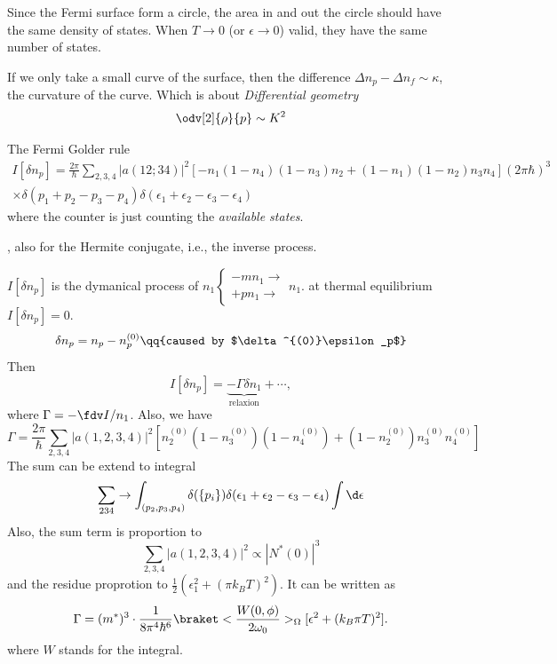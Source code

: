 \begin{remark}
Since the Fermi surface form a circle,
the area in and out the circle should have the same density of states.
When $T \to 0$ (or $\epsilon \to 0$) valid, they have the same number of states.

If we only take a small curve of the surface, then the difference
$\Delta n_p - \Delta n_f \sim \kappa$, the curvature of the curve.
Which is about \emph{Differential geometry}
\[
  \odv[2]{\rho}{p} \sim K^2
\]
\end{remark}

The Fermi Golder rule
\begin{multline}
  I[\delta n_p] = \frac{2\pi}{\hbar} \sum_{2,3,4} |a(12; 34)|^2
    [-n_1(1 - n_4)(1 - n_3)n_2 + (1 - n_1)(1-n_2)n_3n_4] (2\pi\hbar)^3\\
    \times \delta(p_1 + p_2 - p_3 - p_4)
    \delta(\epsilon_1 + \epsilon_2 - \epsilon_3 - \epsilon_4)
\end{multline}
where the counter is just counting the \emph{available states}.
\begin{center}
  , \quad
  also for the Hermite conjugate, i.e., the inverse process.
\end{center}
$I[\delta n_p]$ is the dymanical process of
$n_1 \begin{cases}
  -mn_1 \to\\
  +pn_1 \to
\end{cases} n_1$.
at thermal equilibrium $I[\delta n_p] = 0$.
\[
  \delta n_p = n_p - n_p^{(0)} \qq{caused by $\delta^{(0)}\epsilon_p$}
\]
Then
\[
  I[\delta n_p] = \underbrace{-\Gamma \delta n_1}_\text{relaxion} + \cdots,
\]
where $\Gamma = -\fdv I/{n_1}$. Also, we have
\begin{equation}
  \Gamma = \frac{2\pi}{\hbar} \sum_{2,3,4} |a(1,2,3,4)|^2
  [n_2^{(0)} (1 - n_3^{(0)}) (1 - n_4^{(0)}) +
             (1 - n_2^{(0)})n_3^{(0)}n_4^{(0)}]
\end{equation}
The sum can be extend to integral
\[
  \sum_{234} \to \int_{(p_2,p_3,p_4)} \delta(\{p_i\})
  \delta(\epsilon_1 + \epsilon_2 - \epsilon_3 - \epsilon_4) \int \d\epsilon
\]
Also, the sum term is proportion to
\[
  \sum_{2,3,4} |a(1,2,3,4)|^2 \propto |N^*(0)|^3
\]
and the residue proprotion to $\frac12 (\epsilon_1^2 + (\pi k_BT)^2)$.
It can be written as
\begin{equation}
  \Gamma = (m^*)^3 \cdot \frac1{8\pi^4\hbar^6} \braket<\frac{W(0,\phi)}{2 \omega_0}>_\Omega [\epsilon^2 + (k_B\pi T)^2].
\end{equation}
where $W$ stands for the integral.

